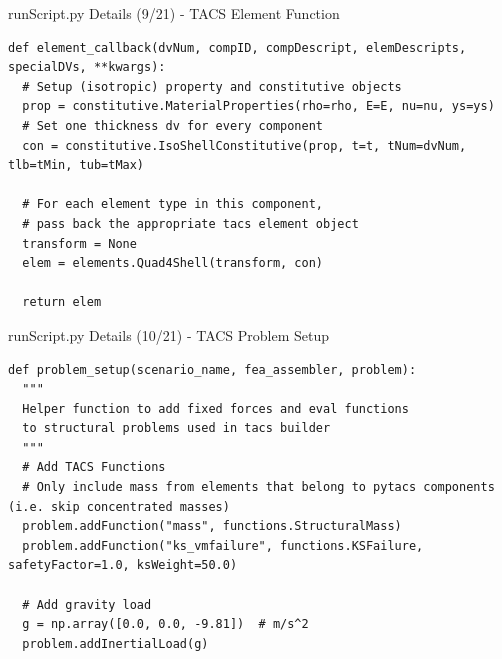 \documentclass{bredelebeamer}
\begin{document}
\begin{frame}[fragile]{runScript.py Details (9/21) - \large TACS Element Function}
\scriptsize
\lstset{ language=bash }
\begin{lstlisting}
def element_callback(dvNum, compID, compDescript, elemDescripts, specialDVs, **kwargs):
  # Setup (isotropic) property and constitutive objects
  prop = constitutive.MaterialProperties(rho=rho, E=E, nu=nu, ys=ys)
  # Set one thickness dv for every component
  con = constitutive.IsoShellConstitutive(prop, t=t, tNum=dvNum, tlb=tMin, tub=tMax)

  # For each element type in this component,
  # pass back the appropriate tacs element object
  transform = None
  elem = elements.Quad4Shell(transform, con)

  return elem
\end{lstlisting}
\normalsize
\end{frame}

\begin{frame}[fragile]{runScript.py Details (10/21) - \large TACS Problem Setup}
\scriptsize
\lstset{ language=bash }
\begin{lstlisting}
def problem_setup(scenario_name, fea_assembler, problem):
  """
  Helper function to add fixed forces and eval functions
  to structural problems used in tacs builder
  """
  # Add TACS Functions
  # Only include mass from elements that belong to pytacs components (i.e. skip concentrated masses)
  problem.addFunction("mass", functions.StructuralMass)
  problem.addFunction("ks_vmfailure", functions.KSFailure, safetyFactor=1.0, ksWeight=50.0)

  # Add gravity load
  g = np.array([0.0, 0.0, -9.81])  # m/s^2
  problem.addInertialLoad(g)
\end{lstlisting}
\normalsize
\end{frame}
\end{document}
